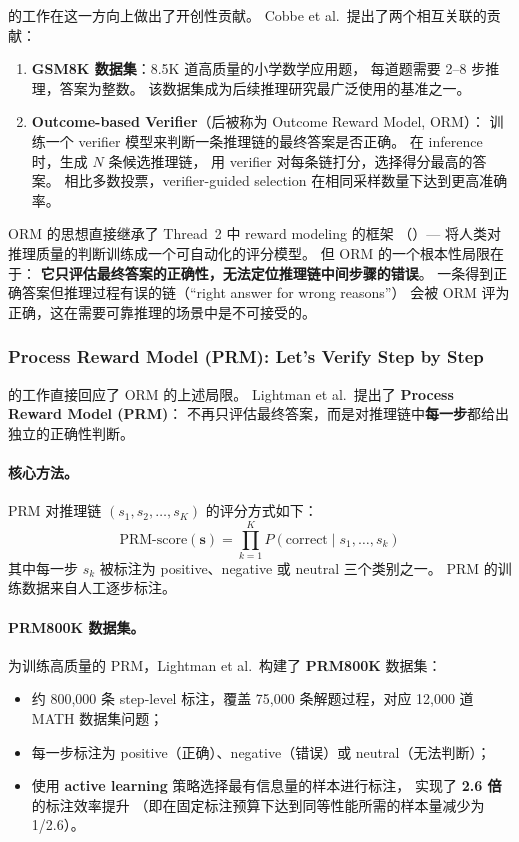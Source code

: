  的工作在这一方向上做出了开创性贡献。
Cobbe et al.\ 提出了两个相互关联的贡献：

\begin{enumerate}[leftmargin=2em]
  \item \textbf{GSM8K 数据集}：8.5K 道高质量的小学数学应用题，
    每道题需要 2--8 步推理，答案为整数。
    该数据集成为后续推理研究最广泛使用的基准之一。

  \item \textbf{Outcome-based Verifier}（后被称为 Outcome Reward Model, ORM）：
    训练一个 verifier 模型来判断一条推理链的最终答案是否正确。
    在 inference 时，生成 $N$ 条候选推理链，
    用 verifier 对每条链打分，选择得分最高的答案。
    相比多数投票，verifier-guided selection 在相同采样数量下达到更高准确率。
\end{enumerate}

\noindent
ORM 的思想直接继承了 Thread~2 中 reward modeling 的框架
（）---
将人类对推理质量的判断训练成一个可自动化的评分模型。
但 ORM 的一个根本性局限在于：
\textbf{它只评估最终答案的正确性，无法定位推理链中间步骤的错误}。
一条得到正确答案但推理过程有误的链（``right answer for wrong reasons''）
会被 ORM 评为正确，这在需要可靠推理的场景中是不可接受的。

\subsubsection{Process Reward Model (PRM): Let's Verify Step by Step}
\label{sec:t4-prm}

 的工作直接回应了 ORM 的上述局限。
Lightman et al.\ 提出了 \textbf{Process Reward Model (PRM)}：
不再只评估最终答案，而是对推理链中\textbf{每一步}都给出独立的正确性判断。

\paragraph{核心方法。}
PRM 对推理链 $(s_1, s_2, \ldots, s_K)$ 的评分方式如下：
\begin{equation}
\label{eq:prm-score}
\text{PRM-score}(\mathbf{s}) = \prod_{k=1}^{K} P(\text{correct} \mid s_1, \ldots, s_k)
\end{equation}
其中每一步 $s_k$ 被标注为 positive、negative 或 neutral 三个类别之一。
PRM 的训练数据来自人工逐步标注。

\paragraph{PRM800K 数据集。}
为训练高质量的 PRM，Lightman et al.\ 构建了 \textbf{PRM800K} 数据集：
\begin{itemize}[leftmargin=2em]
  \item 约 800,000 条 step-level 标注，覆盖 75,000 条解题过程，对应 12,000 道 MATH 数据集问题；
  \item 每一步标注为 positive（正确）、negative（错误）或 neutral（无法判断）；
  \item 使用 \textbf{active learning} 策略选择最有信息量的样本进行标注，
    实现了 \textbf{2.6 倍}的标注效率提升
    （即在固定标注预算下达到同等性能所需的样本量减少为 1/2.6）。
\end{itemize}

